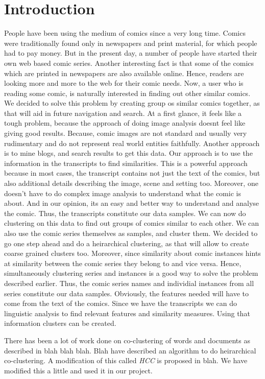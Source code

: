 \documentclass[11pt,twocolumn]{article}
\begin{document}
\section{Introduction}
People have been using the medium of comics since a very long time. Comics were traditionally found only in newspapers and print material, for which people had to pay money. But in the present day, a number of people have started their own web based comic series. Another interesting fact is that some of the comics which are printed in newspapers are also available online. Hence, readers are looking more and more to the web for their comic needs. Now, a user who is reading some comic, is naturally interested in finding out other similar comics. We decided to solve this problem by creating group os similar comics together, as that will aid in future navigation and search. At a first glance, it feels like a tough problem, because the approach of doing image analysis doesnt feel like giving good results. Because, comic images are not standard and usually very rudimentary and do not represent real world entities faithfully. Another approach is to mine blogs, and search results to get this data. Our approach is to use the information in the transcripts to find similarities. This is a powerful approach because in most cases, the transcript contains not just the text of the comics, but also additional details describing the image, scene and setting too. Moreover, one doesn't have to do complex image analysis to understand what the comic is about. And in our opinion, its an easy and better way to understand and analyse the comic. Thus, the transcripts constitute our data samples. We can now do clustering on this data to find out groups of comics similar to each other. We can also use the comic series themselves as samples, and cluster them.  We decided to go one step ahead and do a heirarchical clustering, as that will allow to create coarse grained clusters too. Moreover, since similarity about comic instances hints at similarity between the comic series they belong to and vice versa. Hence, simultaneously clustering series and instances is a good way to solve the problem described earlier. Thus, the comic series names and individial instances from all series constitute our data samples. Obviously, the features needed will have to come from the text of the comics. Since we have the transcripts we can do linguistic analysis to find relevant features and similarity measures. Using that information clusters can be created.

There has been a lot of work done on co-clustering of words and documents as described in blah blah blah. Blah have described an algorithm to do heirarchical co-clustering. A modification of this called \emph{HCC} is proposed in blah. We have modified this a little and used it in our project.
\end{document}
